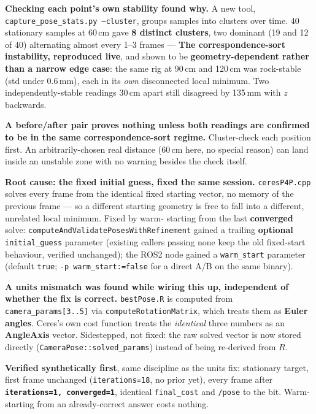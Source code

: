 \documentclass[11pt]{report}
\begin{document}
\textbf{Checking each point's own stability found why.} A new tool,
\texttt{capture\_pose\_stats.py --cluster}, groups samples into clusters
over time. 40 stationary samples at 60\,cm gave \textbf{8 distinct
clusters}, two dominant (19 and 12 of 40) alternating almost every 1--3
frames --- \textbf{The correspondence-sort instability, reproduced
live}, and shown to be \textbf{geometry-dependent rather than a narrow
edge case}: the same rig at 90\,cm and 120\,cm was rock-stable (std under
0.6\,mm), each in its \emph{own} disconnected local minimum. Two
independently-stable readings 30\,cm apart still disagreed by 135\,mm with
$z$ backwards.

\textbf{A before/after pair proves nothing unless both readings are
confirmed to be in the same correspondence-sort regime.} Cluster-check each
position first. An arbitrarily-chosen real distance (60\,cm here, no special
reason) can land inside an unstable zone with no warning besides the check
itself.


\textbf{Root cause: the fixed initial guess, fixed the same session.}
\texttt{ceresP4P.cpp} solves every frame from the identical fixed starting
vector, no memory of the previous frame --- so a different starting geometry
is free to fall into a different, unrelated local minimum. Fixed by warm-
starting from the last \textbf{converged} solve:
\texttt{computeAndValidatePosesWithRefinement} gained a trailing
\textbf{optional} \texttt{initial\_guess} parameter (existing callers passing
none keep the old fixed-start behaviour, verified unchanged); the ROS2 node
gained a \texttt{warm\_start} parameter (default \texttt{true};
\texttt{-p warm\_start:=false} for a direct A/B on the same binary).

\textbf{A units mismatch was found while wiring this up, independent of
whether the fix is correct.} \texttt{bestPose.R} is computed from
\texttt{camera\_params[3..5]} via \texttt{computeRotationMatrix}, which
treats them as \textbf{Euler angles}. Ceres's own cost function treats the
\emph{identical} three numbers as an \textbf{AngleAxis} vector. Sidestepped,
not fixed: the raw solved vector is now stored directly
(\texttt{CameraPose::solved\_params}) instead of being re-derived from $R$.


\textbf{Verified synthetically first}, same discipline as the units fix: stationary
target, first frame unchanged (\texttt{iterations=18}, no prior yet), every
frame after \textbf{\texttt{iterations=1, converged=1}}, identical
\texttt{final\_cost} and \texttt{/pose} to the bit. Warm-starting from an
already-correct answer costs nothing.
\end{document}
